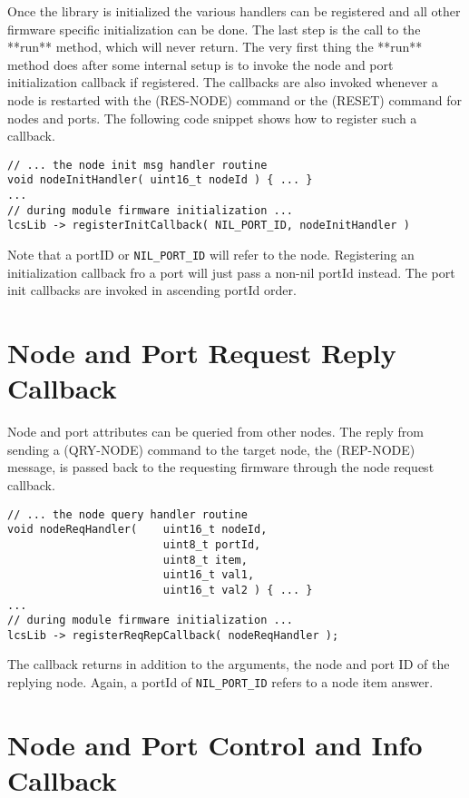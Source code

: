 Once the library is initialized the various handlers can be registered and all other firmware specific initialization can be done. The last step is the call to the **run** method, which will never return. The very first thing the **run** method does after some internal setup is to invoke the node and port initialization callback if registered. The callbacks are also invoked whenever a node is restarted with the (RES-NODE) command or the (RESET) command for nodes and ports. The following code snippet shows how to register such a callback.

\lstset{style=codesnippetstyle}
\begin{lstlisting}
// ... the node init msg handler routine
void nodeInitHandler( uint16_t nodeId ) { ... }
...
// during module firmware initialization ...
lcsLib -> registerInitCallback( NIL_PORT_ID, nodeInitHandler )
\end{lstlisting}

Note that a portID or \texttt{NIL\_PORT\_ID} will refer to the node. Registering an initialization callback fro a port will just pass a non-nil portId instead. The port init callbacks are invoked in ascending portId order.

\section{Node and Port Request Reply Callback}

Node and port attributes can be queried from other nodes. The reply from sending a (QRY-NODE) command to the target node, the (REP-NODE) message, is passed back to the requesting firmware through the node request callback.

\lstset{style=codesnippetstyle}
\begin{lstlisting}
// ... the node query handler routine
void nodeReqHandler(    uint16_t nodeId, 
                        uint8_t portId, 
                        uint8_t item, 
                        uint16_t val1, 
                        uint16_t val2 ) { ... }
...
// during module firmware initialization ...
lcsLib -> registerReqRepCallback( nodeReqHandler );
\end{lstlisting}

The callback returns in addition to the arguments, the node and port ID of the replying node. Again, a portId of \texttt{NIL\_PORT\_ID} refers to a node item answer.

\section{Node and Port Control and Info Callback}

